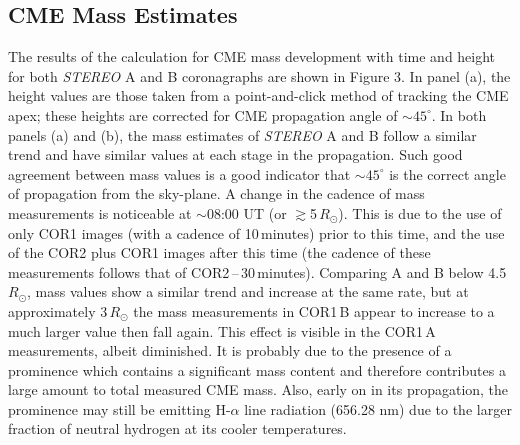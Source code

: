 \documentclass{emulateapj}
\begin{document}
\subsection{CME Mass Estimates}
The results of the calculation for CME mass development with time and height for both \emph{STEREO} A and B coronagraphs are shown in Figure 3. In panel (a), the height values are those taken from a point-and-click method of tracking the CME apex; these heights are corrected for CME propagation angle of $\sim$$45^{\circ}$.  In both panels (a) and (b), the mass estimates of \emph{STEREO} A and B follow a similar trend and have similar values at each stage in the propagation. Such good agreement between mass values is a good indicator that $\sim$$45^{\circ}$ is the correct angle of propagation from the sky-plane. A change in the cadence of mass measurements is noticeable at $\sim$08:00 UT (or $\gtrsim$5\,$R_{\odot}$). This is due to the use of only COR1 images (with a cadence of 10\,minutes) prior to this time, and the use of the COR2 plus COR1 images after this time (the cadence of these measurements follows that of COR2\,--\,30\,minutes). Comparing A and B below 4.5\,$R_{\odot}$, mass values show a similar trend and increase at the same rate, but at approximately 3\,$R_{\odot}$ the mass measurements in COR1\,B appear to increase to a much larger value then fall again. This effect is visible in the COR1\,A measurements, albeit diminished. It is probably due to the presence of a prominence which contains a significant mass content and therefore contributes a large amount to total measured CME mass. Also, early on in its propagation, the prominence may still be emitting H-$\alpha$ line radiation (656.28 nm) due to the larger fraction of neutral hydrogen at its cooler temperatures.
\end{document}
